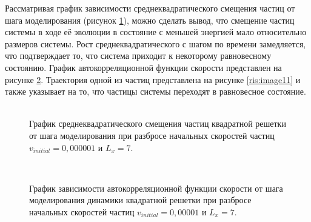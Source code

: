 \documentclass[14pt,a4paper,report]{ncc}
\begin{document}
Рассматривая график зависимости среднеквадратического смещения частиц от шага моделирования (рисунок \ref{ris:image9}), можно сделать вывод, что смещение частиц системы в ходе её эволюции в состояние с меньшей энергией мало относительно размеров системы. Рост среднеквадратического с шагом по времени замедляется, что подтверждает то, что система приходит к некоторому равновесному состоянию. 
График автокорреляционной функции скорости представлен на рисунке \ref{ris:image10}. Траектория одной из частиц представлена на рисунке \ref{ris:image11} и также указывает на то, что частицы системы переходят в равновесное состояние.
\

\begin{figure}[]
\caption{График среднеквадратического смещения частиц квадратной решетки от шага моделирования при разбросе начальных скоростей частиц  $v_{initial} = 0,000001 $ и  $L_x=7$.}
\label{ris:image9}
\end{figure}
\


\begin{figure}[]
\caption{График зависимости автокорреляционной функции скорости от шага моделирования динамики квадратной решетки при разбросе начальных скоростей частиц $v_{initial} = 0,00001 $ и  $L_x=7$.}
\label{ris:image10}
\end{figure}
\
\end{document}
